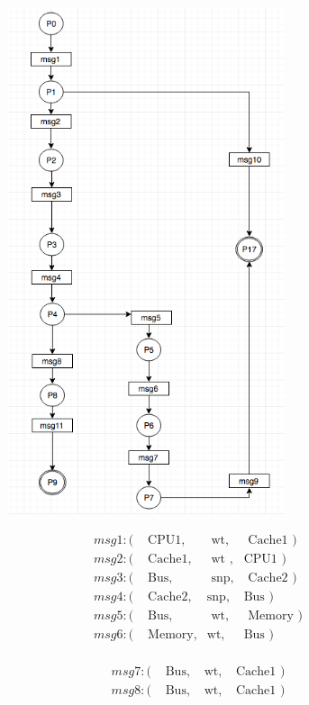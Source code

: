 \documentclass[12pt,frontmatter,copyright,thesis]{usfmanus}
\begin{document}
\begin{appendix}
\begin{figure}[h]
 \centerline{
 \includegraphics[width=3.2in]{rw}}
 \begin{minipage}{.5\textwidth}
 {\footnotesize
 \[
 \begin{array}{llll}
 msg1: (&\mbox{ CPU1},&\mbox{ wt},&\mbox{ Cache1 })\\
 msg2: (&\mbox{ Cache1},&\mbox{ wt },&\mbox{CPU1 })\\     
 msg3: (&\mbox{ Bus},&\mbox{ snp},&\mbox{ Cache2     })\\
 msg4: (&\mbox{ Cache2},&\mbox{snp},&\mbox{Bus })\\
 msg5: (&\mbox{ Bus},&\mbox{ wt},&\mbox{ Memory     })\\ 
 msg6: (&\mbox{ Memory},&\mbox{wt},&\mbox{Bus     })\\
 \end{array}
 \]}
 \end{minipage}
 \begin{minipage}{.5\textwidth}
 {\footnotesize
 \[
 \begin{array}{llll}
  msg7: (&\mbox{ Bus},&\mbox{ wt},&\mbox{ Cache1 })\\
 msg8: (&\mbox{ Bus},&\mbox{ wt},&\mbox{ Cache1 })\\

\end{array}\]}
\end{minipage}
\end{figure}
\end{appendix}
\end{document}

